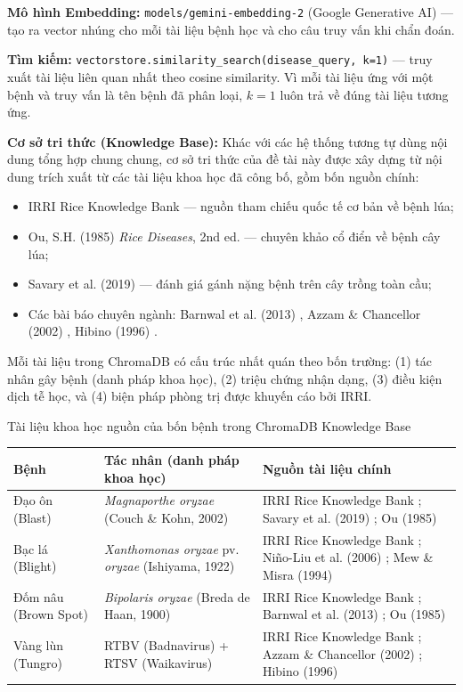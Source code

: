 \textbf{Mô hình Embedding:} \texttt{models/gemini-embedding-2} (Google Generative AI) --- tạo ra vector nhúng cho mỗi tài liệu bệnh học và cho câu truy vấn khi chẩn đoán.

\textbf{Tìm kiếm:} \texttt{vectorstore.similarity\_search(disease\_query, k=1)} --- truy xuất tài liệu liên quan nhất theo cosine similarity. Vì mỗi tài liệu ứng với một bệnh và truy vấn là tên bệnh đã phân loại, $k=1$ luôn trả về đúng tài liệu tương ứng.

\textbf{Cơ sở tri thức (Knowledge Base):} Khác với các hệ thống tương tự dùng nội dung tổng hợp chung chung, cơ sở tri thức của đề tài này được xây dựng từ nội dung trích xuất từ các tài liệu khoa học đã công bố, gồm bốn nguồn chính:
\begin{itemize}[leftmargin=1.5cm]
    \item IRRI Rice Knowledge Bank \cite{irri_rkb} --- nguồn tham chiếu quốc tế cơ bản về bệnh lúa;
    \item Ou, S.H. (1985) \textit{Rice Diseases}, 2nd ed. \cite{ou1985} --- chuyên khảo cổ điển về bệnh cây lúa;
    \item Savary et al. (2019) \cite{savary2019} --- đánh giá gánh nặng bệnh trên cây trồng toàn cầu;
    \item Các bài báo chuyên ngành: Barnwal et al. (2013) \cite{barnwal2013}, Azzam \& Chancellor (2002) \cite{azzam2002}, Hibino (1996) \cite{hibino1996}.
\end{itemize}

Mỗi tài liệu trong ChromaDB có cấu trúc nhất quán theo bốn trường: (1) tác nhân gây bệnh (danh pháp khoa học), (2) triệu chứng nhận dạng, (3) điều kiện dịch tễ học, và (4) biện pháp phòng trị được khuyến cáo bởi IRRI.

\begin{table}[H]{Tài liệu khoa học nguồn của bốn bệnh trong ChromaDB Knowledge Base}
\centering
\begin{tabularx}{\textwidth}{p{2.2cm} p{3.2cm} X}
\toprule
\textbf{Bệnh} & \textbf{Tác nhân (danh pháp khoa học)} & \textbf{Nguồn tài liệu chính} \\
\midrule
Đạo ôn (Blast) & \textit{Magnaporthe oryzae} (Couch \& Kohn, 2002) & IRRI Rice Knowledge Bank \cite{irri_rkb}; Savary et al. (2019) \cite{savary2019}; Ou (1985) \cite{ou1985} \\[5pt]
Bạc lá (Blight) & \textit{Xanthomonas oryzae} pv. \textit{oryzae} (Ishiyama, 1922) & IRRI Rice Knowledge Bank \cite{irri_rkb}; Ni\~{n}o-Liu et al. (2006) \cite{ninoliu2006}; Mew \& Misra (1994) \cite{mew1994} \\[5pt]
Đốm nâu (Brown Spot) & \textit{Bipolaris oryzae} (Breda de Haan, 1900) & IRRI Rice Knowledge Bank \cite{irri_rkb}; Barnwal et al. (2013) \cite{barnwal2013}; Ou (1985) \cite{ou1985} \\[5pt]
Vàng lùn (Tungro) & RTBV (Badnavirus) + RTSV (Waikavirus) & IRRI Rice Knowledge Bank \cite{irri_rkb}; Azzam \& Chancellor (2002) \cite{azzam2002}; Hibino (1996) \cite{hibino1996} \\
\bottomrule
\end{tabularx}
\end{table}

